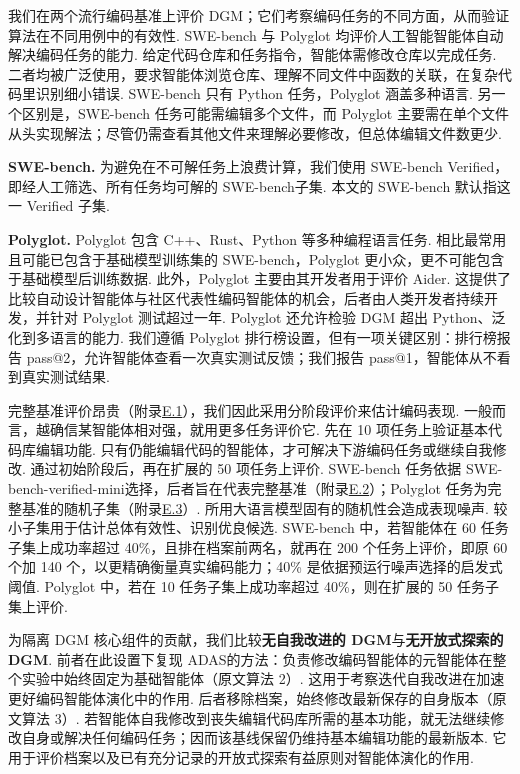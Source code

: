 我们在两个流行编码基准上评价 DGM；它们考察编码任务的不同方面，从而验证算法在不同用例中的有效性. SWE-bench 与 Polyglot 均评价人工智能智能体自动解决编码任务的能力. 给定代码仓库和任务指令，智能体需修改仓库以完成任务. 二者均被广泛使用\cite{dgm-zhang2024autocoderover,dgm-zhang2024rest,dgm-xia2024agentless,dgm-cao2024spider2,dgm-GoogleDeepMind2025GeminiThinking,dgm-aider2024}，要求智能体浏览仓库、理解不同文件中函数的关联，在复杂代码里识别细小错误. SWE-bench 只有 Python 任务，Polyglot 涵盖多种语言. 另一个区别是，SWE-bench 任务可能需编辑多个文件，而 Polyglot 主要需在单个文件从头实现解法；尽管仍需查看其他文件来理解必要修改，但总体编辑文件数更少.

\textbf{SWE-bench.} 为避免在不可解任务上浪费计算，我们使用 SWE-bench Verified\cite{dgm-openai2024sweverified}，即经人工筛选、所有任务均可解的 SWE-bench\cite{dgm-jimenez2024swebench}子集. 本文的 SWE-bench 默认指这一 Verified 子集.

\textbf{Polyglot.} Polyglot 包含 C++、Rust、Python 等多种编程语言任务\cite{dgm-gauthier2024polyglot}. 相比最常用且可能已包含于基础模型训练集的 SWE-bench，Polyglot 更小众，更不可能包含于基础模型后训练数据. 此外，Polyglot 主要由其开发者用于评价 Aider\cite{dgm-aider2024}. 这提供了比较自动设计智能体与社区代表性编码智能体的机会，后者由人类开发者持续开发，并针对 Polyglot 测试超过一年. Polyglot 还允许检验 DGM 超出 Python、泛化到多语言的能力. 我们遵循 Polyglot 排行榜设置，但有一项关键区别：排行榜报告 pass@2，允许智能体查看一次真实测试反馈；我们报告 pass@1，智能体从不看到真实测试结果.

完整基准评价昂贵（附录\hyperref[dgm-app:cost-estimate]{E.1}），我们因此采用分阶段评价来估计编码表现. 一般而言，越确信某智能体相对强，就用更多任务评价它. 先在 10 项任务上验证基本代码库编辑功能. 只有仍能编辑代码的智能体，才可解决下游编码任务或继续自我修改. 通过初始阶段后，再在扩展的 50 项任务上评价. SWE-bench 任务依据 SWE-bench-verified-mini\cite{dgm-hobbhahn2025swebenchmini}选择，后者旨在代表完整基准（附录\hyperref[dgm-app:swebench-tasks]{E.2}）；Polyglot 任务为完整基准的随机子集（附录\hyperref[dgm-app:polyglot-tasks]{E.3}）. 所用大语言模型固有的随机性会造成表现噪声. 较小子集用于估计总体有效性、识别优良候选. SWE-bench 中，若智能体在 60 任务子集上成功率超过 40\%，且排在档案前两名，就再在 200 个任务上评价，即原 60 个加 140 个，以更精确衡量真实编码能力；40\% 是依据预运行噪声选择的启发式阈值. Polyglot 中，若在 10 任务子集上成功率超过 40\%，则在扩展的 50 任务子集上评价.

为隔离 DGM 核心组件的贡献，我们比较\textbf{无自我改进的 DGM}与\textbf{无开放式探索的 DGM}. 前者在此设置下复现 ADAS\cite{dgm-hu2025automated}的方法：负责修改编码智能体的元智能体在整个实验中始终固定为基础智能体（原文算法 2）. 这用于考察迭代自我改进在加速更好编码智能体演化中的作用. 后者移除档案，始终修改最新保存的自身版本（原文算法 3）. 若智能体自我修改到丧失编辑代码库所需的基本功能，就无法继续修改自身或解决任何编码任务；因而该基线保留仍维持基本编辑功能的最新版本. 它用于评价档案以及已有充分记录的开放式探索有益原则\cite{dgm-clune2019ai,dgm-stanley2015greatness,dgm-zhang2024omni,dgm-fernandopromptbreeder,dgm-lee2020learning,dgm-samvelyan2024rainbow,dgm-colas2022autotelic}对智能体演化的作用.

